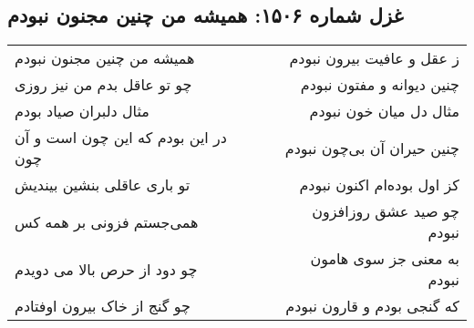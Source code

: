 \begin{center}
\section*{غزل شماره ۱۵۰۶: همیشه من چنین مجنون نبودم}
\label{sec:1506}
\begin{longtable}{l p{0.5cm} r}
همیشه من چنین مجنون نبودم
&&
ز عقل و عافیت بیرون نبودم
\\
چو تو عاقل بدم من نیز روزی
&&
چنین دیوانه و مفتون نبودم
\\
مثال دلبران صیاد بودم
&&
مثال دل میان خون نبودم
\\
در این بودم که این چون است و آن چون
&&
چنین حیران آن بی‌چون نبودم
\\
تو باری عاقلی بنشین بیندیش
&&
کز اول بوده‌ام اکنون نبودم
\\
همی‌جستم فزونی بر همه کس
&&
چو صید عشق روزافزون نبودم
\\
چو دود از حرص بالا می دویدم
&&
به معنی جز سوی هامون نبودم
\\
چو گنج از خاک بیرون اوفتادم
&&
که گنجی بودم و قارون نبودم
\\
\end{longtable}
\end{center}
